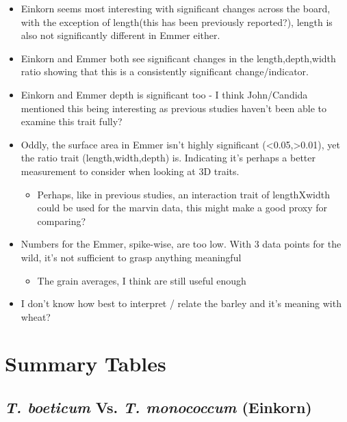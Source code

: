 \documentclass[a4paper]{article}
\begin{document}
\begin{itemize}
\item Einkorn seems most interesting with significant changes across the board, with the exception of length(this has been previously reported?), length is also not significantly different in Emmer either.

\item Einkorn and Emmer both see significant changes in the length,depth,width ratio showing that this is a consistently significant change/indicator.

\item Einkorn and Emmer depth is significant too - I think John/Candida mentioned this being interesting as previous studies haven't been able to examine this trait fully?

\item Oddly, the surface area in Emmer isn't highly significant (<0.05,>0.01), yet the ratio trait (length,width,depth) is. Indicating it's perhaps a better measurement to consider when looking at 3D traits.

\begin{itemize}
\item Perhaps, like in previous studies, an interaction trait of lengthXwidth could be used for the marvin data, this might make a good proxy for comparing?
\end{itemize}

\item Numbers for the Emmer, spike-wise, are too low. With 3 data points for the wild, it's not sufficient to grasp anything meaningful
\begin{itemize}
\item The grain averages, I think are still useful enough
\end{itemize}

\item I don't know how best to interpret / relate the barley and it's meaning with wheat?
\end{itemize}

\clearpage
\section*{Summary Tables}
\label{sec-3}

\subsection*{\emph{T. boeticum} Vs. \emph{T. monococcum} (Einkorn)}
\label{sec-3-1}
\end{document}
